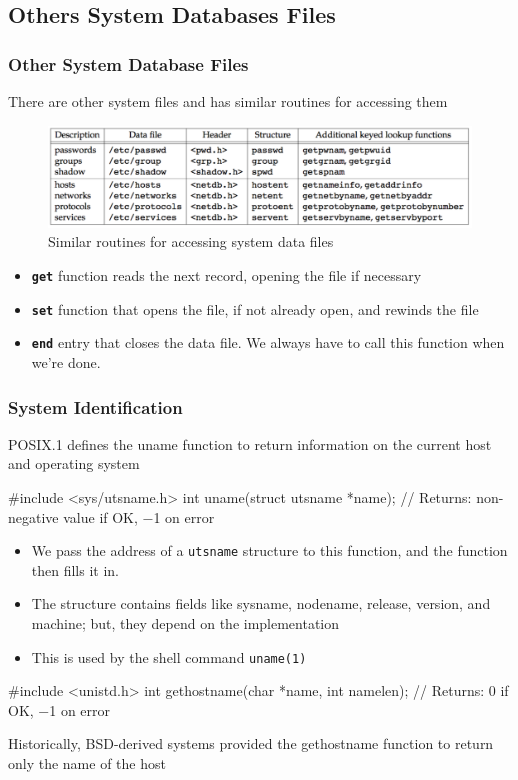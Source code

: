 \documentclass[newPxFont,sthlmFooter,nooffset]{beamer}
\begin{document}
\subsection{Others System Databases Files}

\begin{frame}[t]
  \frametitle{Other System Database Files}
There are other system files and has similar routines for accessing them


\begin{figure}[h]
  \centering
  \includegraphics[width=\textwidth]{figure/fig6-6_similar.png}
  \caption{Similar routines for accessing system data files}
\end{figure}


\begin{itemize}
\item \textbf{\texttt{get}} function reads the next record, opening the file if necessary
\item \textbf{\texttt{set}} function that opens the file, if not already open, and rewinds the file
\item \textbf{\texttt{end}} entry that closes the data file. We always have to call this function when we're done.
\end{itemize}

\end{frame}


\begin{frame}[containsverbatim,t]
  \frametitle{System Identification}
POSIX.1 defines the uname function to return information on the current host and operating system

\begin{codedef}
#include <sys/utsname.h>
int uname(struct utsname *name);
// Returns: non-negative value if OK, −1 on error
\end{codedef}

{\footnotesize
  \begin{itemize}
  \item We pass the address of a \texttt{utsname} structure to this function, and the function then fills it in.
  \item The structure contains fields like sysname, nodename, release, version, and machine; but, they depend on the implementation
  \item This is used by the shell command \texttt{uname(1)}
  \end{itemize}
}


\begin{codedef}
#include <unistd.h>
int gethostname(char *name, int namelen);
// Returns: 0 if OK, −1 on error
\end{codedef}
Historically, BSD-derived systems provided the gethostname function to return only the name of the host


\end{frame}
\end{document}
